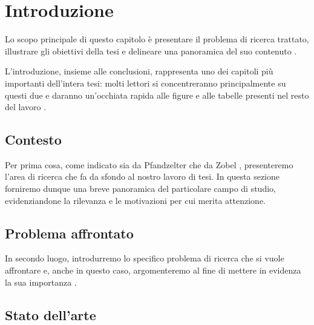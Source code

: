\chapter{Introduzione} 
\label{chap:introduzione}

\acresetall

Lo scopo principale di questo capitolo è presentare il problema di ricerca trattato, illustrare gli obiettivi della tesi e delineare una panoramica del suo contenuto \cite{pfandzelter2022thesis}.

\medskip

L'introduzione, insieme alle conclusioni, rappresenta uno dei capitoli più importanti dell'intera tesi: molti lettori si concentreranno principalmente su questi due e daranno un'occhiata rapida alle figure e alle tabelle presenti nel resto del lavoro \cite{tuni2019guide}.

\section{Contesto}

Per prima cosa, come indicato sia da Pfandzelter \etAl \cite{pfandzelter2022thesis} che da Zobel \cite{zobel2015writing}, presenteremo l'area di ricerca che fa da sfondo al nostro lavoro di tesi. In questa sezione forniremo dunque una breve panoramica del particolare campo di studio, evidenziandone la rilevanza e le motivazioni per cui merita attenzione.

\section{Problema affrontato}

In secondo luogo, introdurremo lo specifico problema di ricerca che si vuole affrontare e, anche in questo caso, argomenteremo al fine di mettere in evidenza la sua importanza \cite{zobel2015writing}.

\section{Stato dell'arte}

